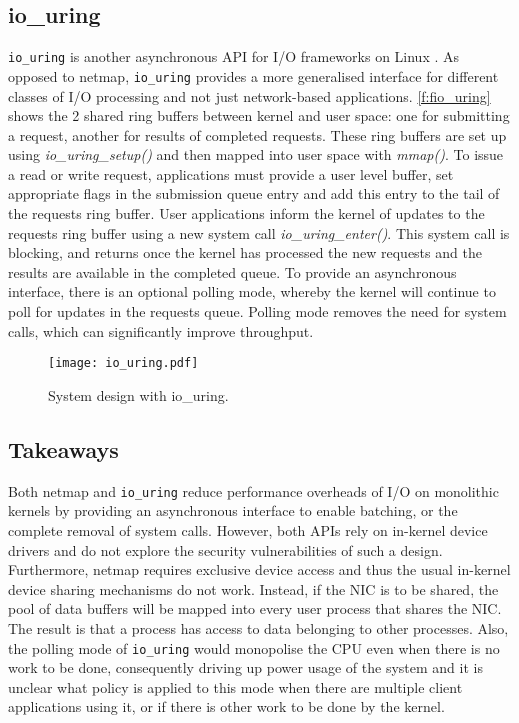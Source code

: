 \subsection{io\_uring}\label{io_uring}
\lstinline{io_uring} is another asynchronous API for I/O frameworks on Linux \cite{io_uring}. 
As opposed to netmap, \lstinline{io_uring} provides a more generalised interface for different 
classes of I/O processing and not just network-based applications. \autoref{f:fio_uring} shows the 2 shared
ring buffers between kernel and user space: one for submitting a request, another for results of completed requests. 
These ring buffers are set up using \emph{io\_uring\_setup()} and then mapped into user space with \emph{mmap()}. 
To issue a read or write request, applications must provide a user level buffer, set appropriate flags in the submission
queue entry and add this entry to the tail of the requests ring buffer. User applications inform
the kernel of updates to the requests ring buffer using a new system call \emph{io\_uring\_enter()}. This system call is blocking, 
and returns once the kernel has processed the new requests and the results are available in the completed queue. 
To provide an asynchronous interface, there is an optional polling mode, whereby the kernel will continue to poll for updates
in the requests queue. Polling mode removes the need for system calls, which can significantly improve throughput.

\begin{figure}[h]
	\centering
	\texttt{[image: io\_uring.pdf]}
	\caption{System design with io\_uring.}
	\label{f:fio_uring}
  \end{figure}

\subsection{Takeaways}
Both netmap \cite{Rizzo_12} and \lstinline{io_uring} \cite{io_uring} reduce performance overheads of I/O on monolithic kernels
by providing an asynchronous interface to enable batching, or the complete removal of system calls. However, both APIs 
rely on in-kernel device drivers and do not explore the security vulnerabilities of such a design. 
Furthermore, netmap requires exclusive device access and thus the usual in-kernel device sharing mechanisms do not work. 
Instead, if the NIC is to be shared, the pool of data buffers will be mapped into every user process that shares the NIC. 
The result is that a process has access to data belonging to other processes. Also, the polling mode of
\lstinline{io_uring} would monopolise the CPU even when there is no work to be done, consequently driving up
power usage of the system and it is unclear what policy is applied to this mode when there are multiple client
applications using it, or if there is other work to be done by the kernel.


